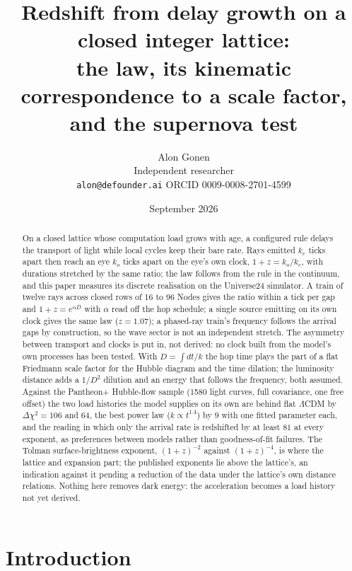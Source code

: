 \documentclass[11pt]{article}
\title{Redshift from delay growth on a closed integer lattice:\\
the law, its kinematic correspondence to a scale factor, and the supernova test}
\author{Alon Gonen\\
\small Independent researcher\\
\small \texttt{alon@defounder.ai} \quad ORCID 0009-0008-2701-4599}
\date{September 2026}
\begin{document}
\maketitle

\begin{abstract}
On a closed lattice whose computation load grows with age, a configured
rule delays the transport of light while local cycles keep their bare
rate. Rays emitted $k_e$ ticks apart then reach an eye $k_o$ ticks apart on
the eye's own clock, $1 + z = k_o/k_e$, with durations stretched by the
same ratio; the law follows from the rule in the continuum, and this paper
measures its discrete realisation on the Universe24 simulator. A train of
twelve rays across closed rows of 16 to 96 Nodes gives the ratio within a
tick per gap and $1 + z = e^{\alpha D}$ with $\alpha$ read off the hop
schedule; a single source emitting on its own clock gives the same law
($z = 1.07$); a phased-ray train's frequency follows the
arrival gaps by construction, so the wave sector is not an independent
stretch. The asymmetry between transport and clocks is put in, not
derived: no clock built from the model's own processes has been tested. With $D = \int dt/k$ the hop time
plays the part of a flat Friedmann scale factor for the Hubble diagram and
the time dilation; the luminosity distance adds a $1/D^2$ dilution and an
energy that follows the frequency, both assumed. Against the Pantheon+
Hubble-flow sample (1580 light curves, full covariance, one free offset)
the two load histories the model supplies on its own are behind flat
$\Lambda$CDM by $\Delta\chi^2 = 106$ and $64$, the best power law
($k \propto t^{1.4}$) by $9$ with one fitted parameter each, and the
reading in which only the arrival rate is redshifted by at least $81$ at
every exponent, as preferences between models rather than goodness-of-fit
failures. The Tolman surface-brightness exponent, $(1+z)^{-2}$ against
$(1+z)^{-4}$, is where the lattice and expansion part; the published
exponents lie above the lattice's, an indication against it pending a
reduction of the data under the lattice's own distance relations. Nothing
here removes dark energy: the acceleration becomes a load history not yet
derived.
\end{abstract}

\section{Introduction}
\end{document}
